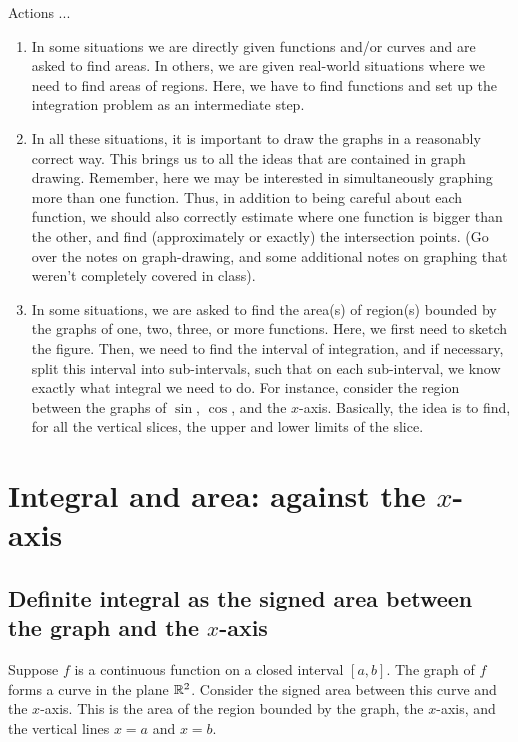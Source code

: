 \documentclass[10pt]{amsart}
\begin{document}
Actions ...

\begin{enumerate}
\item In some situations we are directly given functions and/or curves
  and are asked to find areas. In others, we are given real-world
  situations where we need to find areas of regions. Here, we have to
  find functions and set up the integration problem as an intermediate
  step.
\item In all these situations, it is important to draw the graphs in a
  reasonably correct way. This brings us to all the ideas that are
  contained in graph drawing. Remember, here we may be interested in
  simultaneously graphing more than one function. Thus, in addition to
  being careful about each function, we should also correctly estimate
  where one function is bigger than the other, and find (approximately
  or exactly) the intersection points. (Go over the notes on
  graph-drawing, and some additional notes on graphing that weren't
  completely covered in class).
\item In some situations, we are asked to find the area(s) of
  region(s) bounded by the graphs of one, two, three, or more
  functions. Here, we first need to sketch the figure. Then, we need
  to find the interval of integration, and if necessary, split this
  interval into sub-intervals, such that on each sub-interval, we know
  exactly what integral we need to do. For instance, consider the
  region between the graphs of $\sin$, $\cos$, and the
  $x$-axis. Basically, the idea is to find, for all the vertical
  slices, the upper and lower limits of the slice.
\end{enumerate}

\section{Integral and area: against the $x$-axis}

\subsection{Definite integral as the signed area between the graph and the $x$-axis}

Suppose $f$ is a continuous function on a closed interval $[a,b]$. The
graph of $f$ forms a curve in the plane $\mathbb{R}^2$. Consider the signed
area between this curve and the $x$-axis. This is the area of the
region bounded by the graph, the $x$-axis, and the vertical lines $x =
a$ and $x = b$.
\end{document}
